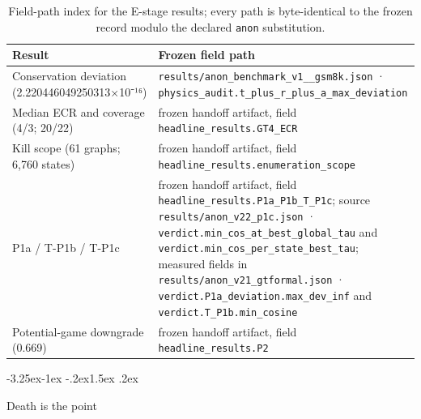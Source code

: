 \documentclass[11pt,a4paper]{article}
\makeatletter
\renewcommand\subsection{\@startsection{subsection}{2}{\z@}%
  {-3.25ex\@plus -1ex \@minus -.2ex}{1.5ex \@plus .2ex}%
  {\normalfont\large\bfseries\raggedright}}
\makeatother
\begin{document}
\begin{table}[htbp]
\centering
\small
\setlength{\tabcolsep}{4pt}
\renewcommand{\arraystretch}{1.15}
\begin{tabularx}{0.985\textwidth}{@{}>{\raggedright\arraybackslash}p{}>{\raggedright\arraybackslash}X@{}}
\toprule
\textbf{Result} & \textbf{Frozen field path} \\
\midrule
Conservation deviation (2.220446049250313\allowbreak ×10⁻¹⁶) & \texttt{results/\allowbreak anon\_\allowbreak benchmark\_\allowbreak v1\_\allowbreak 4\_\allowbreak gsm8k.json} · \texttt{physics\_\allowbreak audit.t\_\allowbreak plus\_\allowbreak r\_\allowbreak plus\_\allowbreak a\_\allowbreak max\_\allowbreak deviation} \\
Median ECR and coverage (4/3; 20/22) & frozen handoff artifact, field \texttt{headline\_\allowbreak results.GT4\_\allowbreak ECR} \\
Kill scope (61 graphs; 6,760 states) & frozen handoff artifact, field \texttt{headline\_\allowbreak results.enumeration\_\allowbreak scope} \\
P1a / T-P1b / T-P1c & frozen handoff artifact, field \texttt{headline\_\allowbreak results.P1a\_\allowbreak P1b\_\allowbreak T\_\allowbreak P1c}; source \texttt{results/\allowbreak anon\_\allowbreak v22\_\allowbreak p1c.json} · \texttt{verdict.min\_\allowbreak cos\_\allowbreak at\_\allowbreak best\_\allowbreak global\_\allowbreak tau} and \texttt{verdict.min\_\allowbreak cos\_\allowbreak per\_\allowbreak state\_\allowbreak best\_\allowbreak tau}; measured fields in \texttt{results/\allowbreak anon\_\allowbreak v21\_\allowbreak gtformal.json} · \texttt{verdict.P1a\_\allowbreak deviation.max\_\allowbreak dev\_\allowbreak inf} and \texttt{verdict.T\_\allowbreak P1b.min\_\allowbreak cosine} \\
Potential-game downgrade (0.669) & frozen handoff artifact, field \texttt{headline\_\allowbreak results.P2} \\
\bottomrule
\end{tabularx}
\caption{Field-path index for the E-stage results; every path is byte-identical to the frozen record modulo the declared \texttt{anon} substitution.}
\label{tab:fieldpathsE}
\end{table}

\subsection{Death is the point}
\end{document}
